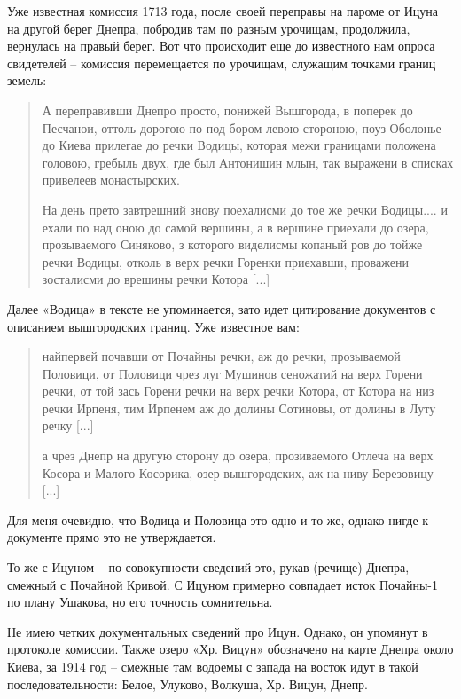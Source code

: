 Уже известная комиссия 1713 года, после своей переправы на пароме от Ицуна на другой берег Днепра, побродив там по разным урочищам, продолжила, вернулась на правый берег. Вот что происходит еще до известного нам опроса свидетелей – комиссия перемещается по урочищам, служащим точками границ земель:

\begin{quotation}
А переправивши Днепро просто, понижей Вышгорода, в поперек до Песчанои, оттоль дорогою по под бором левою стороною, поуз Оболонье до Киева прилегае до речки Водицы, которая межи границами положена головою, гребыль двух, где был Антонишин млын, так выражени в списках привелеев монастырских.

На день прето завтрешний знову поехалисми до тое же речки Водицы.... и ехали по над оною до самой вершины, а в вершине приехали до озера, прозываемого Синяково, з которого виделисмы копаный ров до тойже речки Водицы, отколь в верх речки Горенки приехавши, проважени зосталисми до врешины речки Котора [...] 
\end{quotation}

Далее «Водица» в тексте не упоминается, зато идет цитирование документов с описанием вышгородских границ. Уже известное вам:

\begin{quotation}
найпервей почавши от Почайны речки, аж до речки, прозываемой Половици, от Половици чрез луг Мушинов сеножатий на верх Горени речки, от той зась Горени речки на верх речки Котора, от Котора на низ речки Ирпеня, тим Ирпенем аж до долины Сотиновы, от долины в Луту речку [...]

а чрез Днепр на другую сторону до озера, прозиваемого Отлеча на верх Косора и Малого Косорика, озер вышгородских, аж на ниву Березовицу [...]
\end{quotation}

Для меня очевидно, что Водица и Половица это одно и то же, однако нигде к документе прямо это не утверждается.

То же с Ицуном – по совокупности сведений это, рукав (речище) Днепра, смежный с Почайной Кривой. С Ицуном примерно совпадает исток Почайны-1 по плану Ушакова, но его точность сомнительна.

Не имею четких документальных сведений про Ицун. Однако, он упомянут в протоколе комиссии. Также озеро «Хр. Вицун» обозначено на карте Днепра около Киева, за 1914 год – смежные там водоемы с запада на восток идут в такой последовательности: Белое, Улуково, Волкуша, Хр. Вицун, Днепр.

